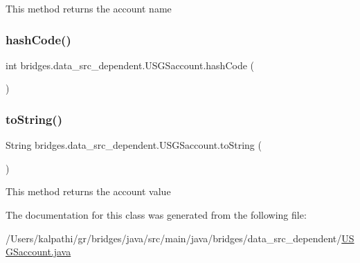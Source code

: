 This method returns the account name \mbox{\label{classbridges_1_1data__src__dependent_1_1_u_s_g_saccount_afe2cc53d7993aaf4424f42fb535c7ed1}} 
\subsubsection{\texorpdfstring{hashCode()}{hashCode()}}
{\footnotesize\ttfamily int bridges.\+data\+\_\+src\+\_\+dependent.\+U\+S\+G\+Saccount.\+hash\+Code (\begin{DoxyParamCaption}{ }\end{DoxyParamCaption})}

\mbox{\label{classbridges_1_1data__src__dependent_1_1_u_s_g_saccount_a832c5a4953a40fd3fa89243fcdabc435}} 
\subsubsection{\texorpdfstring{toString()}{toString()}}
{\footnotesize\ttfamily String bridges.\+data\+\_\+src\+\_\+dependent.\+U\+S\+G\+Saccount.\+to\+String (\begin{DoxyParamCaption}{ }\end{DoxyParamCaption})}

This method returns the account value 

The documentation for this class was generated from the following file\+:\begin{DoxyCompactItemize}
\item 
/\+Users/kalpathi/gr/bridges/java/src/main/java/bridges/data\+\_\+src\+\_\+dependent/\mbox{\hyperlink{_u_s_g_saccount_8java}{U\+S\+G\+Saccount.\+java}}\end{DoxyCompactItemize}
